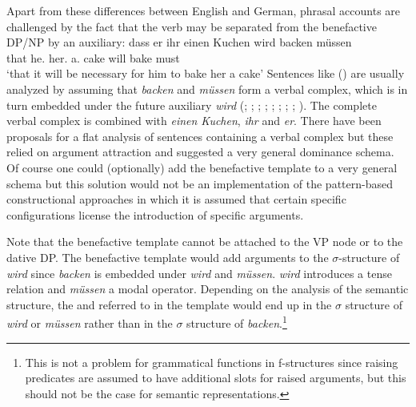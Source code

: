 Apart from these differences between English and German, phrasal accounts are challenged by the fact that the verb may be separated from the benefactive DP/NP by an auxiliary:
\ea
\label{ex-wird-backen-muessen}
\gll dass er ihr einen Kuchen wird backen müssen\\
     that he.\nom{} her.\dat{} a.\acc{} cake       will bake   must\\
\glt `that it will be necessary for him to bake her a cake'
\z
Sentences like () are usually analyzed by assuming that \emph{backen} and \emph{müssen} form
a verbal complex, which is in turn embedded under the future auxiliary \emph{wird}
(\citealt{Bech55a}; \citealt{HN89a,HN94a}; \citealp{Haider90a}; \citealt{Kiss95a};
\citealt{Meurers99a}; \citealt{Kathol2001a}; \citealt{Mueller99a,Mueller2002b};
\citealt[Section~3.2.4]{Berman2003a}; \citealt{FR2009a-u}). The complete
verbal complex is combined with \emph{einen Kuchen}, \emph{ihr} and \emph{er}. There have been
proposals for a flat analysis of sentences containing a verbal complex \citep{BvN98} but these
relied on argument attraction and suggested a very general dominance schema. Of course one could (optionally) add
the benefactive template to a very general schema but this solution would not be an implementation
of the pattern-based constructional approaches in which it is assumed that certain specific
configurations license the introduction of specific arguments.

Note that the benefactive template cannot be attached to the VP node or to the dative DP. The benefactive template
would add arguments to the $\sigma$-structure of \emph{wird} since \emph{backen} is embedded under
\emph{wird} and \emph{müssen}. \emph{wird} introduces a tense relation and \emph{müssen} a modal
operator. Depending on the analysis of the semantic structure, the \argtwo and \argthree referred to
in the  template would end up in the $\sigma$ structure of \emph{wird} or
\emph{müssen} rather than in the $\sigma$ structure of \emph{backen}.\footnote{%
  This is not a problem for grammatical functions in f-structures  since raising predicates are assumed to have
  additional slots for raised arguments, but this should not be the case for semantic
  representations.
}


